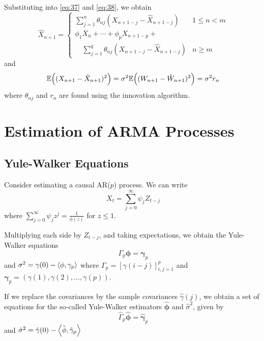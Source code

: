 \begin{lem}
  Substituting into \eqref{eq:37} and \eqref{eq:38}, we obtain
  \begin{equation}
    \label{eq:41}
    \hat X_{n+1} =
    \begin{cases}
      \sum_{j=1}^{n} \theta_{nj}(X_{n+1-j} - \hat X_{n+1-j}) & 1 \leq n < m \\
      \phi_{1} X_{n} + \cdots + \phi_{p} X_{n+1-p} + \\
      \quad \sum_{j=1}^{q} \theta_{nj}(X_{n+1-j} - \hat X_{n+1-j}) & n \geq
      m
    \end{cases}
  \end{equation}
  and
  \begin{equation}
    \label{eq:42}
    \E{(X_{n+1} - \hat X_{n+1})^{2}} = \sigma^{2} \E{(W_{n+1} - \hat
      W_{n+1})^{2}} = \sigma^{2} r_{n}
  \end{equation}
  where $\theta_{nj}$ and $r_{n}$ are found using the innovation algorithm.
\end{lem}


\section{Estimation of \textsc{ARMA} Processes}
\label{sec:estim-arma-proc}

\subsection{Yule-Walker Equations}
\label{sec:yule-walk-equat}

Consider estimating a causal AR($p$) process.  We can write
\begin{equation}
  \label{eq:27}
  X_{t} = \sum_{j=0}^{\infty} \psi_{j} Z_{t-j}
\end{equation} where $\sum_{j=0}^{\infty} \psi_{j} z^{j} =
\frac{1}{\phi(z)}$ for $z \leq 1$.

Multiplying each side by $Z_{t-j}$, and taking expectations, we obtain
the Yule-Walker equations
\begin{equation}
  \label{eq:34}
  \Gamma_{p} \mathbf{\phi} = \mathbf{\gamma}_{p}
\end{equation} and $\sigma^{2} = \gamma(0) - \IP{\mathbf{\phi},
  \mathbf{\gamma}_{p}}$ where $\Gamma_{p} = [\gamma(i -j)]^{p}_{i, j =
1}$  and $\mathbf{\gamma}_{p} = (\gamma(1), \gamma(2), \dots,
\gamma(p))$.

If we replace the covariances by the sample covariances $\hat
\gamma(j)$, we obtain a set of equations for the so-called Yule-Walker
estimators $\hat{\mathbf{\phi}}$ and $\hat \sigma^{2}$, given by
\begin{equation}
  \label{eq:43}
  \hat \Gamma_{p} \hat{\mathbf{\phi}} = \hat{\mathbf{\gamma}}_{p}
\end{equation}
and $\hat \sigma^{2} = \hat \gamma(0) - \IP{\hat{\mathbf{\phi}}, \hat{\mathbf{\gamma}}_{p}}$

